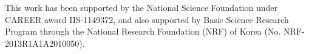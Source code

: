 \documentclass[twocolumn]{svjour3}          %
\begin{document}

%





\begin{acknowledgements}
This work has been supported by the National Science Foundation under CAREER award IIS-1149372, and also supported by Basic Science Research Program through the National Research Foundation (NRF) of Korea (No. NRF-2013R1A1A2010050).
\end{acknowledgements}

\end{document}
